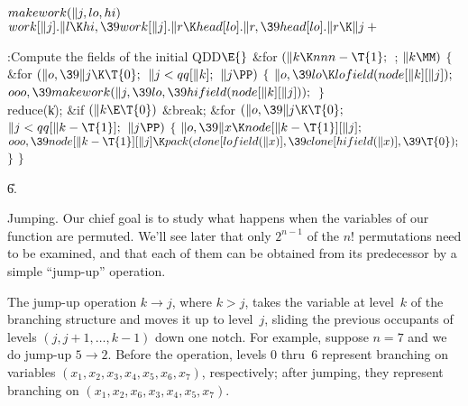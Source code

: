 \Y\B\4\D$\\{makework}(\|j,\\{lo},\\{hi})$ \5
$\\{work}[\|j].\|l\K\\{hi},\39\\{work}[\|j].\|r\K\\{head}[\\{lo}].\|r,\39%
\\{head}[\\{lo}].\|r\K\|j+{}$\par
\Y\B\4:Compute the  fields of the initial QDD\X${}\E{}$\6
\&{for} ${}(\|k\K\\{nnn}-\T{1};{}$  ; ${}\|k\MM){}$\5
${}\{{}$\1\6
\&{for} ${}(\|o,\39\|j\K\T{0};{}$ ${}\|j<\\{qq}[\|k];{}$ ${}\|j\PP){}$\5
${}\{{}$\1\6
${}\|o,\39\\{lo}\K\\{lofield}(\\{node}[\|k][\|j]);{}$\6
${}\\{ooo},\39\\{makework}(\|j,\39\\{lo},\39\\{hifield}(\\{node}[\|k][%
\|j]));{}$\6
\4${}\}{}$\2\6
\\{reduce}(\|k);\6
\&{if} ${}(\|k\E\T{0}){}$\1\5
\&{break};\2\6
\&{for} ${}(\|o,\39\|j\K\T{0};{}$ ${}\|j<\\{qq}[\|k-\T{1}];{}$ ${}\|j\PP){}$\5
${}\{{}$\1\6
${}\|o,\39\|x\K\\{node}[\|k-\T{1}][\|j];{}$\6
${}\\{ooo},\39\\{node}[\|k-\T{1}][\|j]\K\\{pack}(\\{clone}[\\{lofield}(\|x)],%
\39\\{clone}[\\{hifield}(\|x)],\39\T{0});{}$\6
\4${}\}{}$\2\6
\4${}\}{}$\2\par
\U6.\fi

Jumping. Our chief goal is to study what happens when the variables
of our function are permuted. We'll see later that only $2^{n-1}$
of the $n!$ permutations need to be examined, and that each of them
can be obtained from its predecessor by a simple ``jump-up'' operation.

The jump-up operation $k\to j$, where $k>j$, takes the variable
at level~$k$ of the branching structure and moves it up to level~$j$,
sliding the previous occupants of levels $(j,j+1,\ldots,k-1)$
down one notch. For example, suppose $n=7$ and we do jump-up $5\to2$.
Before the operation, levels 0 thru~6 represent branching on
variables $(x_1,x_2,x_3,x_4,x_5,x_6,x_7)$, respectively; after jumping, they
represent branching on $(x_1,x_2,x_6,x_3,x_4,x_5,x_7)$.

